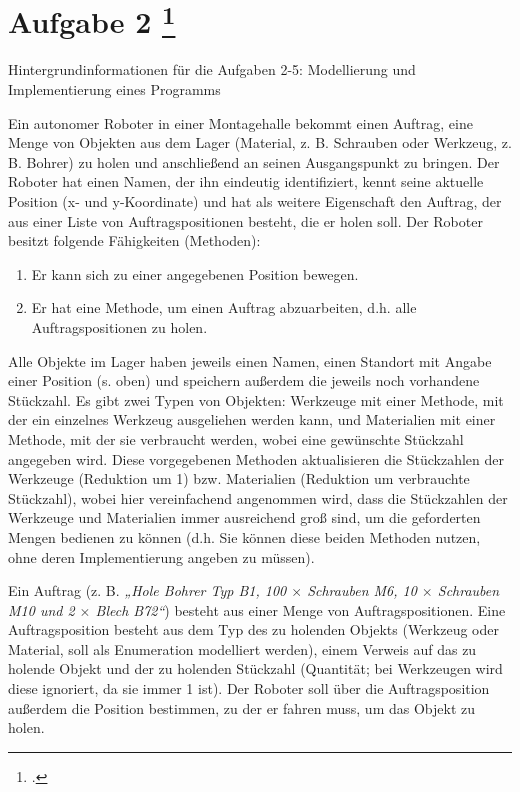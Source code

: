 \documentclass{lehramt-informatik-aufgabe}
\begin{document}
\section{Aufgabe 2
\footcite{66116:2019:03}}

Hintergrundinformationen für die Aufgaben 2-5: Modellierung und
Implementierung eines Programms
\begin{mdframed}[backgroundcolor=white]
\footnotesize
Ein autonomer Roboter in einer Montagehalle bekommt einen Auftrag, eine
Menge von Objekten aus dem Lager (Material, z. B. Schrauben oder
Werkzeug, z. B. Bohrer) zu holen und anschließend an seinen
Ausgangspunkt zu bringen. Der Roboter hat einen Namen, der ihn eindeutig
identifiziert, kennt seine aktuelle Position (x- und y-Koordinate) und
hat als weitere Eigenschaft den Auftrag, der aus einer Liste von
Auftragspositionen besteht, die er holen soll. Der Roboter besitzt
folgende Fähigkeiten (Methoden):

\begin{enumerate}
\item Er kann sich zu einer angegebenen Position bewegen.

\item Er hat eine Methode, um einen Auftrag abzuarbeiten, d.h. alle
Auftragspositionen zu holen.
\end{enumerate}

Alle Objekte im Lager haben jeweils einen Namen, einen Standort mit
Angabe einer Position (s. oben) und speichern außerdem die jeweils noch
vorhandene Stückzahl. Es gibt zwei Typen von Objekten: Werkzeuge mit
einer Methode, mit der ein einzelnes Werkzeug ausgeliehen werden kann,
und Materialien mit einer Methode, mit der sie verbraucht werden, wobei
eine gewünschte Stückzahl angegeben wird. Diese vorgegebenen Methoden
aktualisieren die Stückzahlen der Werkzeuge (Reduktion um 1) bzw.
Materialien (Reduktion um verbrauchte Stückzahl), wobei hier
vereinfachend angenommen wird, dass die Stückzahlen der Werkzeuge und
Materialien immer ausreichend groß sind, um die geforderten Mengen
bedienen zu können (d.h. Sie können diese beiden Methoden nutzen, ohne
deren Implementierung angeben zu müssen).

Ein Auftrag (z. B. \emph{„Hole Bohrer Typ B1, 100 $\times$ Schrauben M6,
10 $\times$ Schrauben M10 und 2 $\times$ Blech B72“}) besteht aus einer
Menge von Auftragspositionen. Eine Auftragsposition besteht aus dem Typ
des zu holenden Objekts (Werkzeug oder Material, soll als Enumeration
modelliert werden), einem Verweis auf das zu holende Objekt und der zu
holenden Stückzahl (Quantität; bei Werkzeugen wird diese ignoriert, da
sie immer 1 ist). Der Roboter soll über die Auftragsposition außerdem
die Position bestimmen, zu der er fahren muss, um das Objekt zu holen.


\end{mdframed}
\end{document}
